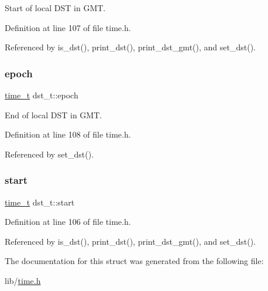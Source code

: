 Start of local D\+ST in G\+MT. 



Definition at line 107 of file time.\+h.



Referenced by is\+\_\+dst(), print\+\_\+dst(), print\+\_\+dst\+\_\+gmt(), and set\+\_\+dst().

\mbox{\label{structdst__t_ae8b931e1a2731b688e1af1253787827c}} 
\subsubsection{\texorpdfstring{epoch}{epoch}}
{\footnotesize\ttfamily \hyperlink{time_8h_a3346b04b0420b32ccf6b706551b70762}{time\+\_\+t} dst\+\_\+t\+::epoch}



End of local D\+ST in G\+MT. 



Definition at line 108 of file time.\+h.



Referenced by set\+\_\+dst().

\mbox{\label{structdst__t_af1868fb321db3637664e3a3bf11cf56b}} 
\subsubsection{\texorpdfstring{start}{start}}
{\footnotesize\ttfamily \hyperlink{time_8h_a3346b04b0420b32ccf6b706551b70762}{time\+\_\+t} dst\+\_\+t\+::start}



Definition at line 106 of file time.\+h.



Referenced by is\+\_\+dst(), print\+\_\+dst(), print\+\_\+dst\+\_\+gmt(), and set\+\_\+dst().



The documentation for this struct was generated from the following file\+:\begin{DoxyCompactItemize}
\item 
lib/\hyperlink{time_8h}{time.\+h}\end{DoxyCompactItemize}
